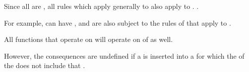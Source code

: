 

Since all  are , all rules which apply
generally to  also apply to .
\Seesection\ArrayConcepts.

For example,
      can have ,
 and  are also subject to the rules of  
        that apply to .

\endsubsection%

All functions that operate on  
will operate on  of  as well.

However,
the consequences are undefined if a  is inserted into a 
for which the  of the  does not include that .

\endsubsection%
